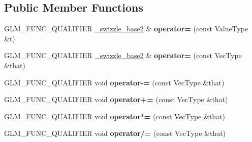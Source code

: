 \subsection*{Public Member Functions}
\begin{DoxyCompactItemize}
\item 
\hypertarget{structglm_1_1detail_1_1__swizzle__base2_a70442376cb261474e23090737deff976}{G\-L\-M\-\_\-\-F\-U\-N\-C\-\_\-\-Q\-U\-A\-L\-I\-F\-I\-E\-R \hyperlink{structglm_1_1detail_1_1__swizzle__base2}{\-\_\-swizzle\-\_\-base2} \& {\bfseries operator=} (const Value\-Type \&t)}\label{structglm_1_1detail_1_1__swizzle__base2_a70442376cb261474e23090737deff976}

\item 
\hypertarget{structglm_1_1detail_1_1__swizzle__base2_a7b982a5056d94cd43393bf820ea627d0}{G\-L\-M\-\_\-\-F\-U\-N\-C\-\_\-\-Q\-U\-A\-L\-I\-F\-I\-E\-R \hyperlink{structglm_1_1detail_1_1__swizzle__base2}{\-\_\-swizzle\-\_\-base2} \& {\bfseries operator=} (const Vec\-Type \&that)}\label{structglm_1_1detail_1_1__swizzle__base2_a7b982a5056d94cd43393bf820ea627d0}

\item 
\hypertarget{structglm_1_1detail_1_1__swizzle__base2_ab583f399dc6685deee97bdd5126f433a}{G\-L\-M\-\_\-\-F\-U\-N\-C\-\_\-\-Q\-U\-A\-L\-I\-F\-I\-E\-R void {\bfseries operator-\/=} (const Vec\-Type \&that)}\label{structglm_1_1detail_1_1__swizzle__base2_ab583f399dc6685deee97bdd5126f433a}

\item 
\hypertarget{structglm_1_1detail_1_1__swizzle__base2_a5e734b2e9da294d92bb347a3c7f44ded}{G\-L\-M\-\_\-\-F\-U\-N\-C\-\_\-\-Q\-U\-A\-L\-I\-F\-I\-E\-R void {\bfseries operator+=} (const Vec\-Type \&that)}\label{structglm_1_1detail_1_1__swizzle__base2_a5e734b2e9da294d92bb347a3c7f44ded}

\item 
\hypertarget{structglm_1_1detail_1_1__swizzle__base2_a6c686d110b936939c7ed67d7a6165778}{G\-L\-M\-\_\-\-F\-U\-N\-C\-\_\-\-Q\-U\-A\-L\-I\-F\-I\-E\-R void {\bfseries operator$\ast$=} (const Vec\-Type \&that)}\label{structglm_1_1detail_1_1__swizzle__base2_a6c686d110b936939c7ed67d7a6165778}

\item 
\hypertarget{structglm_1_1detail_1_1__swizzle__base2_a0a3e5ef1cb68f78a7e1bcd72f6e2dc4c}{G\-L\-M\-\_\-\-F\-U\-N\-C\-\_\-\-Q\-U\-A\-L\-I\-F\-I\-E\-R void {\bfseries operator/=} (const Vec\-Type \&that)}\label{structglm_1_1detail_1_1__swizzle__base2_a0a3e5ef1cb68f78a7e1bcd72f6e2dc4c}


\end{DoxyCompactItemize}
